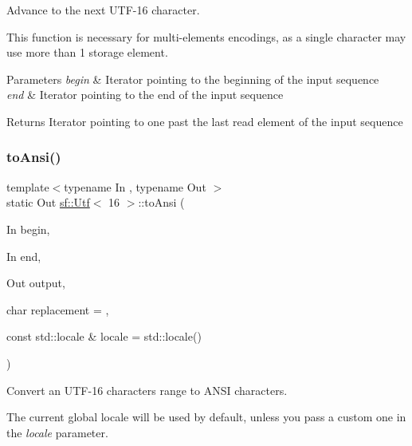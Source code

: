 Advance to the next U\+T\+F-\/16 character. 

This function is necessary for multi-\/elements encodings, as a single character may use more than 1 storage element.


\begin{DoxyParams}{Parameters}
{\em begin} & Iterator pointing to the beginning of the input sequence \\
\hline
{\em end} & Iterator pointing to the end of the input sequence\\
\hline
\end{DoxyParams}
\begin{DoxyReturn}{Returns}
Iterator pointing to one past the last read element of the input sequence \begin{DoxyVerb}\end{DoxyVerb}
 
\end{DoxyReturn}
\mbox{\label{classsf_1_1_utf_3_0116_01_4_a6d2bfbdfe46364bd49bca28a410b18f7}} 
\subsubsection{\texorpdfstring{toAnsi()}{toAnsi()}}
{\footnotesize\ttfamily template$<$typename In , typename Out $>$ \\
static Out \mbox{\hyperlink{classsf_1_1_utf}{sf\+::\+Utf}}$<$ 16 $>$\+::to\+Ansi (\begin{DoxyParamCaption}\item[{In}]{begin,  }\item[{In}]{end,  }\item[{Out}]{output,  }\item[{char}]{replacement = {},  }\item[{const std\+::locale \&}]{locale = {\ttfamily std\+:\+:locale()} }\end{DoxyParamCaption})\hspace{0.3cm}{\ttfamily [static]}}



Convert an U\+T\+F-\/16 characters range to A\+N\+SI characters. 

The current global locale will be used by default, unless you pass a custom one in the {\itshape locale} parameter.


